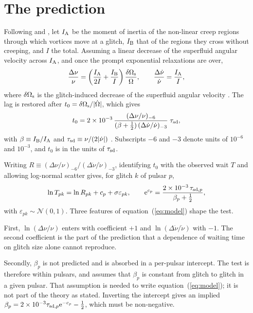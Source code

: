 \documentclass[fleqn,usenatbib]{mnras}
\newcommand{\dnu}{\Delta\nu/\nu}
\newcommand{\dnud}{\Delta\dot\nu/\dot\nu}
\begin{document}
\section{The prediction}\label{sec:theory}
Following \citet{alpar2006} and \citet{zhou2022}, let $I_{\rm A}$ be the
moment of inertia of the non-linear creep regions through which vortices
move at a glitch, $I_{\rm B}$ that of the regions they cross without
creeping, and $I$ the total. Assuming a linear decrease of the superfluid
angular velocity across $I_{\rm A}$, and once the prompt exponential
relaxations are over,
\begin{equation}\label{eq:steps}
\frac{\Delta\nu}{\nu}=\left(\frac{I_{\rm A}}{2I}+\frac{I_{\rm B}}{I}\right)
\frac{\delta\Omega_{\rm s}}{\Omega},\qquad
\frac{\Delta\dot\nu}{\dot\nu}=\frac{I_{\rm A}}{I},
\end{equation}
where $\delta\Omega_{\rm s}$ is the glitch-induced decrease of the
superfluid angular velocity \citep[][equations 45 and 46]{zhou2022}. The lag
is restored after $t_0=\delta\Omega_{\rm s}/|\dot\Omega|$, which gives
\begin{equation}\label{eq:t0}
t_0=2\times10^{-3}\,
\frac{(\dnu)_{-6}}{(\beta+\tfrac12)\,(\dnud)_{-3}}\;\tau_{\rm sd},
\end{equation}
with $\beta\equiv I_{\rm B}/I_{\rm A}$ and $\tau_{\rm sd}\equiv
\nu/(2|\dot\nu|)$ \citep[][equation 48]{zhou2022}. Subscripts $-6$ and $-3$
denote units of $10^{-6}$ and $10^{-3}$, and $t_0$ is in the units of
$\tau_{\rm sd}$.

Writing $R\equiv(\dnu)_{-6}/(\dnud)_{-3}$, identifying $t_0$ with the
observed wait $T$ and allowing log-normal scatter gives, for glitch $k$ of
pulsar $p$,
\begin{equation}\label{eq:model}
\ln T_{pk}=\ln R_{pk}+c_p+\sigma\varepsilon_{pk},\qquad
{\rm e}^{c_p}=\frac{2\times10^{-3}\,\tau_{{\rm sd},p}}{\beta_p+\tfrac12},
\end{equation}
with $\varepsilon_{pk}\sim\mathcal N(0,1)$. Three features of
equation~(\ref{eq:model}) shape the test.

First, $\ln(\dnu)$ enters with coefficient $+1$ and $\ln(\dnud)$ with $-1$.
The second coefficient is the part of the prediction that a dependence of
waiting time on glitch size alone cannot reproduce.

Secondly, $\beta_p$ is not predicted and is absorbed in a per-pulsar
intercept. The test is therefore within pulsars, and assumes that $\beta_p$
is constant from glitch to glitch in a given pulsar. That assumption is
needed to write equation~(\ref{eq:model}); it is not part of the theory as
stated. Inverting the intercept gives an implied $\beta_p=2\times10^{-3}
\tau_{{\rm sd},p}{\rm e}^{-c_p}-\tfrac12$, which must be non-negative.
\end{document}
